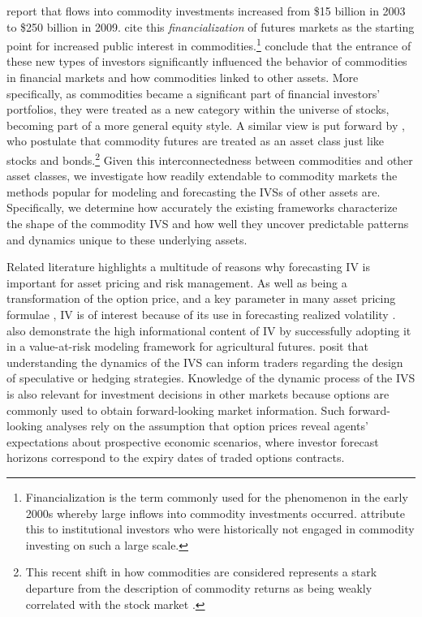\documentclass[12pt,a4paper]{article}
\begin{document}
\cite{irwin2011index} report that flows into commodity investments increased from \$15 billion in 2003 to \$250 billion in 2009. \cite{fattouh2014causes} cite this \textit{financialization} of futures markets as the starting point for increased public interest in commodities.\footnote{Financialization is the term commonly used for the phenomenon in the early 2000s whereby large inflows into commodity investments occurred. \cite{DH07} attribute this to institutional investors who were historically not engaged in commodity investing on such a large scale.} \cite{adams2015financialization} conclude that the entrance of these new types of investors significantly influenced the behavior of commodities in financial markets and how commodities linked to other assets. More specifically, as commodities became a significant part of financial investors\textquoteright{} portfolios, they were treated as a new category within the universe of stocks, becoming part of a more general equity style. A similar view is put forward by \cite{cheng2014financialization}, who postulate that commodity futures are treated as an asset class just like stocks and bonds.\footnote{This recent shift in how commodities are considered represents a stark departure from the description of commodity returns as being weakly correlated with the stock market \citep{bessembinder1992time, gorton2006facts}.} Given this interconnectedness between commodities and other asset classes, we investigate how readily extendable to commodity markets the methods popular for modeling and forecasting the IVSs of other assets are. Specifically, we determine how accurately the existing frameworks characterize the shape of the commodity IVS and how well they uncover predictable patterns and dynamics unique to these underlying assets.

Related literature highlights a multitude of reasons why forecasting IV is important for asset pricing and risk management. As well as being a transformation of the option price, and a key parameter in many asset pricing formulae \citep{Giot03}, IV is of interest because of its use in forecasting realized volatility \citep[see][]{corrado2006estimating, taylor2010information, muzzioli2010option, garvey2012realised}. \cite{Giot03} also demonstrate the high informational content of IV by successfully adopting it in a value-at-risk modeling framework for agricultural futures. \cite{bernales2014can} posit that understanding the dynamics of the IVS can inform traders regarding the design of speculative or hedging strategies. Knowledge of the dynamic process of the IVS is also relevant for investment decisions in other markets because options are commonly used to obtain forward-looking market information. Such forward-looking analyses rely on the assumption that option prices reveal agents\textquoteright{} expectations about prospective economic scenarios, where investor forecast horizons correspond to the expiry dates of traded options contracts.
\end{document}
